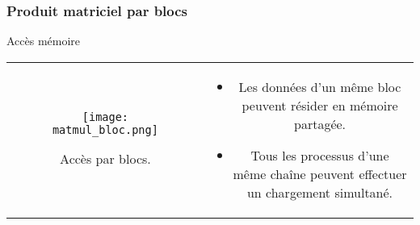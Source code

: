 \begin{frame}
    \frametitle{Produit matriciel par blocs}
\begin{block}{Accès mémoire}
   \begin{tabular}{cc}
        \begin{minipage}{0.45\textwidth}
 \begin{figure}[htbp]
    \centering
   \texttt{[image: matmul\_bloc.png]}
    \caption{Accès par blocs.}
    \label{fig:acces_matmul_bloc}
\end{figure}
        \end{minipage} & 
        \begin{minipage}{0.45\textwidth}
            \begin{itemize}
                \item<+-> Les données d'un même bloc peuvent résider en mémoire partagée.
                \item<+-> Tous les processus d'une même chaîne peuvent effectuer un chargement simultané.
           \end{itemize}
        \end{minipage}
\end{tabular}
\end{block}
\end{frame}